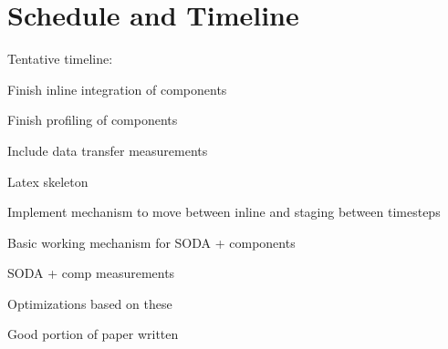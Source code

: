 \section{Schedule and Timeline}
\label{s:timeline}
Tentative timeline:

\squishlist
\item Finish inline integration of components
\item Finish profiling of components
\item Include data transfer measurements
\item Latex skeleton
\squishend

\squishlist
\item Implement mechanism to move between inline and staging between timesteps
\item Basic working mechanism for SODA + components
\squishend

\squishlist
\item SODA + comp measurements
\item Optimizations based on these
\item Good portion of paper written
\squishend

